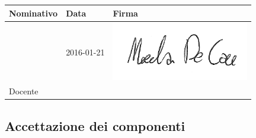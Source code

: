 \documentclass[12pt,a4paper]{article}
\begin{document}
\begin{table}[H]
	\begin{center}
		\begin{tabular}{l l l}
			\toprule
            \textbf{Nominativo}	& \textbf{Data} & \textbf{Firma} \\ \midrule
			\midrule
			\RE{} & 2016-01-21 & \includegraphics[width=6cm]{../img/firmaDeCao.png} \\ \midrule
			Docente &  & \\
		\end{tabular}
	\end{center}
\end{table}

\subsection{Accettazione dei componenti}
\end{document}
